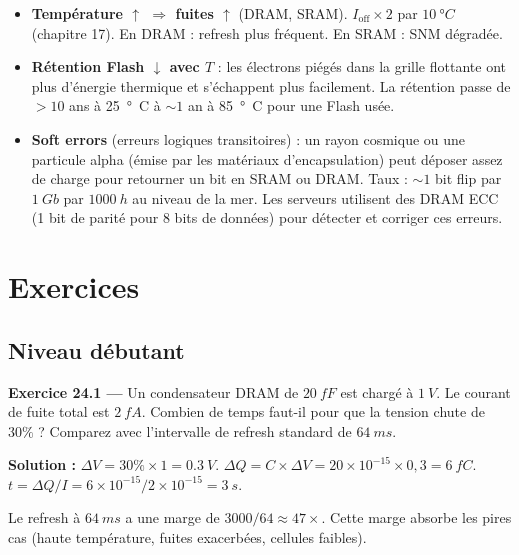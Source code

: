 \documentclass[12pt,a4paper,twoside]{book}
\begin{document}
\begin{formule}
\begin{itemize}[nosep]
\item \textbf{Température $\uparrow$ $\Rightarrow$ fuites $\uparrow$} (DRAM, SRAM). $I_{\text{off}} \times 2$ par $\SI{10}{°C}$ (chapitre 17). En DRAM : refresh plus fréquent. En SRAM : SNM dégradée.
\item \textbf{Rétention Flash $\downarrow$ avec $T$} : les électrons piégés dans la grille flottante ont plus d'énergie thermique et s'échappent plus facilement. La rétention passe de $> 10$ ans à \SI{25}{°C} à $\sim 1$ an à \SI{85}{°C} pour une Flash usée.
\item \textbf{Soft errors} (erreurs logiques transitoires) : un rayon cosmique ou une particule alpha (émise par les matériaux d'encapsulation) peut déposer assez de charge pour retourner un bit en SRAM ou DRAM. Taux : $\sim 1$ bit flip par $\SI{1}{Gb}$ par $\SI{1000}{h}$ au niveau de la mer. Les serveurs utilisent des DRAM ECC (1 bit de parité pour 8 bits de données) pour détecter et corriger ces erreurs.
\end{itemize}
\end{formule}

\section*{Exercices}

\subsection*{Niveau débutant}

\textbf{Exercice 24.1 ---} Un condensateur DRAM de $\SI{20}{fF}$ est chargé à $\SI{1}{V}$. Le courant de fuite total est $\SI{2}{fA}$. Combien de temps faut-il pour que la tension chute de $30\%$ ? Comparez avec l'intervalle de refresh standard de $\SI{64}{ms}$.

\begin{pratique}
\textbf{Solution :} $\Delta V = 30\% \times 1 = \SI{0.3}{V}$. $\Delta Q = C \times \Delta V = 20\times10^{-15}\times0{,}3 = \SI{6}{fC}$. $t = \Delta Q/I = 6\times10^{-15}/2\times10^{-15} = \SI{3}{s}$.

Le refresh à $\SI{64}{ms}$ a une marge de $3000/64 \approx 47\times$. Cette marge absorbe les pires cas (haute température, fuites exacerbées, cellules faibles).
\end{pratique}
\end{document}
